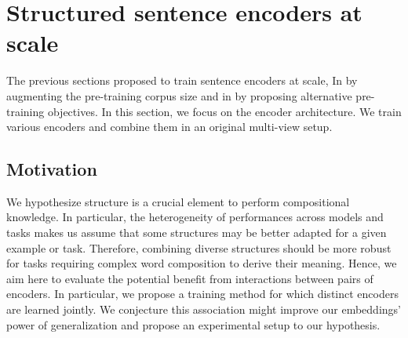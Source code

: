 \setchapterpreamble[u]{\margintoc}
\chapter{Structured sentence encoders at scale}



The previous sections proposed to train sentence encoders at scale, In  by augmenting the pre-training corpus size and in  by proposing alternative pre-training objectives. In this section, we focus on the encoder architecture. We train various encoders and combine them in an original multi-view setup.





\section{Motivation}

We hypothesize structure is a crucial element to perform compositional knowledge. In particular, the heterogeneity of performances across models and tasks makes us assume that some structures may be better adapted for a given example or task. Therefore, combining diverse structures should be more robust for tasks requiring complex word composition to derive their meaning. Hence, we aim here to evaluate the potential benefit from interactions between pairs of encoders. In particular, we propose a training method for which distinct encoders are learned jointly. We conjecture this association might improve our embeddings' power of generalization and propose an experimental setup to  our hypothesis.

